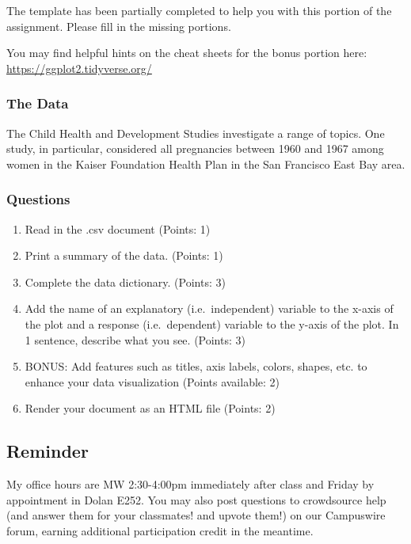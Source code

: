 \documentclass[
  letterpaper,
  DIV=11,
  numbers=noendperiod]{scrartcl}
\providecommand{\tightlist}{%
  \setlength{\itemsep}{0pt}\setlength{\parskip}{0pt}}\usepackage{longtable,booktabs,array}
\begin{document}
The template has been partially completed to help you with this portion
of the assignment. Please fill in the missing portions.

You may find helpful hints on the cheat sheets for the bonus portion
here: \url{https://ggplot2.tidyverse.org/}

\subsubsection{The Data}\label{the-data}

The Child Health and Development Studies investigate a range of topics.
One study, in particular, considered all pregnancies between 1960 and
1967 among women in the Kaiser Foundation Health Plan in the San
Francisco East Bay area.

\subsubsection{Questions}\label{questions-1}

\begin{enumerate}
\def\labelenumi{\arabic{enumi}.}
\tightlist
\item
  Read in the .csv document (Points: 1)
\item
  Print a summary of the data. (Points: 1)
\item
  Complete the data dictionary. (Points: 3)
\item
  Add the name of an explanatory (i.e.~independent) variable to the
  x-axis of the plot and a response (i.e.~dependent) variable to the
  y-axis of the plot. In 1 sentence, describe what you see. (Points: 3)
\item
  BONUS: Add features such as titles, axis labels, colors, shapes, etc.
  to enhance your data visualization (Points available: 2)
\item
  Render your document as an HTML file (Points: 2)
\end{enumerate}

\subsection{Reminder}\label{reminder}

My office hours are MW 2:30-4:00pm immediately after class and Friday by
appointment in Dolan E252. You may also post questions to crowdsource
help (and answer them for your classmates! and upvote them!) on our
Campuswire forum, earning additional participation credit in the
meantime.
\end{document}
